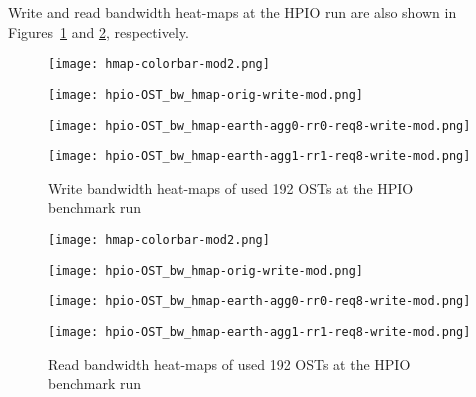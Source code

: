 \documentclass{jhps}
\begin{document}
Write and read bandwidth heat-maps at the HPIO run are also shown in
Figures~\ref{fig:HPIO_OST_BW_HMAP_WR}
and \ref{fig:HPIO_OST_BW_HMAP_RD}, respectively.
%
\begin{figure}[htb]
\begin{minipage}[t]{0.06\textwidth}
 \texttt{[image: hmap-colorbar-mod2.png]}
\end{minipage}
%
\noindent
\begin{minipage}[t]{0.29\textwidth}
 \centering
 \texttt{[image: hpio-OST\_bw\_hmap-orig-write-mod.png]}
\end{minipage}
%
\noindent
\begin{minipage}[t]{0.29\textwidth}
 \centering
 \texttt{[image: hpio-OST\_bw\_hmap-earth-agg0-rr0-req8-write-mod.png]}
\end{minipage}
%
\noindent
\begin{minipage}[t]{0.31\textwidth}
 \centering
 \texttt{[image: hpio-OST\_bw\_hmap-earth-agg1-rr1-req8-write-mod.png]}
\end{minipage}
%
\caption{Write bandwidth heat-maps of used 192 OSTs at the HPIO benchmark run}
\label{fig:HPIO_OST_BW_HMAP_WR}
\end{figure}
%
\begin{figure}[tb]
\begin{minipage}[t]{0.06\textwidth}
 \texttt{[image: hmap-colorbar-mod2.png]}
\end{minipage}
%
\noindent
\begin{minipage}[t]{0.29\textwidth}
 \centering
 \texttt{[image: hpio-OST\_bw\_hmap-orig-write-mod.png]}
\end{minipage}
%
\noindent
\begin{minipage}[t]{0.29\textwidth}
 \centering
 \texttt{[image: hpio-OST\_bw\_hmap-earth-agg0-rr0-req8-write-mod.png]}
\end{minipage}
%
\noindent
\begin{minipage}[t]{0.31\textwidth}
 \centering
 \texttt{[image: hpio-OST\_bw\_hmap-earth-agg1-rr1-req8-write-mod.png]}
\end{minipage}
%
\caption{Read bandwidth heat-maps of used 192 OSTs at the HPIO benchmark run}
\label{fig:HPIO_OST_BW_HMAP_RD}
\end{figure}
\end{document}
